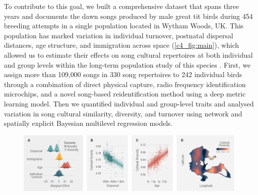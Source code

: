 \documentclass[9pt, twocolumn, twoside]{gsajnl}
\begin{document}
To contribute to this goal, we built a comprehensive dataset that spans three years and documents the dawn songs produced by male great tit birds during 454 breeding attempts in a single population located in Wytham Woods, UK. This population has marked variation in individual turnover, postnatal dispersal distances, age structure, and immigration across space (\autoref{c4_fig:main}), which allowed us to estimate their effects on song cultural repertoires at both individual and group levels within the long-term population study of this species \parencite{lack1964}. First, we assign more than 109,000 songs in 330 song repertoires to 242 individual birds through a combination of direct physical capture, radio frequency identification microchips, and a novel song-based reidentification method using a deep metric learning model. Then we quantified individual and group-level traits and analysed variation in song cultural similarity, diversity, and turnover using network and spatially explicit Bayesian multilevel regression models.

\begin{figure}[!hbt]
    \centering
    \includegraphics[width=\linewidth]{figures/chapter_4/FIG3.pdf}
    \label{c4_fig:diversity}
\end{figure}
\end{document}
